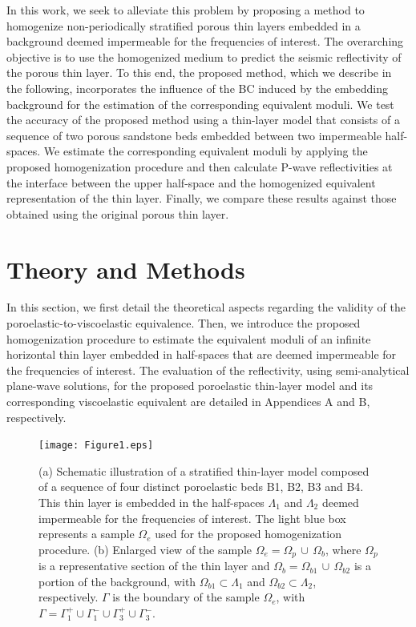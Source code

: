 \documentclass[draft]{agujournal2019}
\begin{document}
In this work, we seek to alleviate this problem by proposing a method to homogenize non-periodically stratified porous thin layers embedded in a background deemed impermeable for the frequencies of interest. The overarching objective is to use the homogenized medium to predict the seismic reflectivity of the porous thin layer.
To this end, the proposed method, which we describe in the following, incorporates the influence of the BC induced by the embedding background for the estimation of the corresponding equivalent moduli.
We test the accuracy of the proposed method using a thin-layer model that consists of a sequence of two  porous sandstone beds embedded between two impermeable half-spaces. We estimate the corresponding equivalent moduli by applying the proposed homogenization procedure and then calculate P-wave reflectivities at the interface between the upper half-space and the homogenized equivalent representation of the thin layer. Finally, we compare these results against those obtained using the original porous thin layer.
 
\section{Theory and Methods}
In this section, we first detail the theoretical aspects regarding the validity of the poroelastic-to-viscoelastic equivalence. Then, we introduce the proposed homogenization procedure to estimate the equivalent moduli of an infinite horizontal thin layer embedded in half-spaces that are deemed impermeable for the frequencies of interest.  
The evaluation of the reflectivity, using  semi-analytical plane-wave solutions, for the proposed poroelastic thin-layer model and its corresponding viscoelastic equivalent are detailed in Appendices A and B, respectively.

\begin{figure}[!ht]
\centering
        \texttt{[image: Figure1.eps]}
\caption{ (a) Schematic illustration of a stratified thin-layer model composed of a sequence of four distinct poroelastic beds B1, B2, B3 and B4. This thin layer is embedded in the half-spaces $\Lambda_1$ and $\Lambda_2$ deemed impermeable for the frequencies of interest. The light blue box represents a sample $\Omega_e$ used for the proposed homogenization procedure. (b) Enlarged view of the sample $\Omega_e = \Omega_p \, \cup \, \Omega_b$, where  $\Omega_p$ is a representative section of the thin layer and  $\Omega_b= \Omega_{b1}  \, \cup \, \Omega_{b2}$ is a portion of the background, with $\Omega_{b1} \subset \Lambda_1$ and $\Omega_{b2} \subset \Lambda_2$, respectively. $\Gamma$ is the boundary of the  sample $\Omega_e$, with  $\Gamma = \Gamma_1^+ \cup \Gamma_1^- \cup \Gamma_3^+ \cup \Gamma_3^-$.
}
\label{fig.1}
\end{figure}
\end{document}
